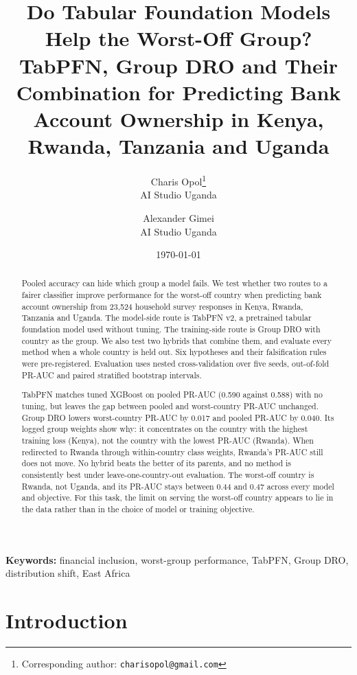\documentclass[11pt]{article}
\title{\textbf{Do Tabular Foundation Models Help the Worst-Off Group? TabPFN, Group DRO and Their Combination for Predicting Bank Account Ownership in Kenya, Rwanda, Tanzania and Uganda}}
\author{
  Charis Opol\thanks{Corresponding author: \texttt{charisopol@gmail.com}} \\
  \normalsize AI Studio Uganda \\
  \and
  Alexander Gimei \\
  \normalsize AI Studio Uganda \\
}
\date{\today}
\begin{document}
\maketitle

\begin{abstract}
Pooled accuracy can hide which group a model fails. We test whether two routes to a fairer classifier improve performance for the worst-off country when predicting bank account ownership from 23,524 household survey responses in Kenya, Rwanda, Tanzania and Uganda. The model-side route is TabPFN v2, a pretrained tabular foundation model used without tuning. The training-side route is Group DRO with country as the group. We also test two hybrids that combine them, and evaluate every method when a whole country is held out. Six hypotheses and their falsification rules were pre-registered. Evaluation uses nested cross-validation over five seeds, out-of-fold PR-AUC and paired stratified bootstrap intervals.

TabPFN matches tuned XGBoost on pooled PR-AUC (0.590 against 0.588) with no tuning, but leaves the gap between pooled and worst-country PR-AUC unchanged. Group DRO lowers worst-country PR-AUC by 0.017 and pooled PR-AUC by 0.040. Its logged group weights show why: it concentrates on the country with the highest training loss (Kenya), not the country with the lowest PR-AUC (Rwanda). When redirected to Rwanda through within-country class weights, Rwanda's PR-AUC still does not move. No hybrid beats the better of its parents, and no method is consistently best under leave-one-country-out evaluation. The worst-off country is Rwanda, not Uganda, and its PR-AUC stays between 0.44 and 0.47 across every model and objective. For this task, the limit on serving the worst-off country appears to lie in the data rather than in the choice of model or training objective.
\end{abstract}

\vspace{0.5cm}
\noindent\textbf{Keywords:} financial inclusion, worst-group performance, TabPFN, Group DRO, distribution shift, East Africa


\section{Introduction}
\end{document}

